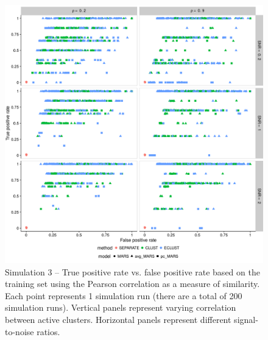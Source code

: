 \begin{appendices}
\begin{figure}
	\includegraphics[scale=0.6, keepaspectratio]{./figs/hydra/results/figures/sim3-sept27/tpr_fpr_Correlation_sim3.png}
	\caption{Simulation 3 -- True positive rate vs. false positive rate based on the training set using the Pearson correlation as a measure of similarity. Each point represents 1 simulation run (there are a total of 200 simulation runs). Vertical panels represent varying correlation between active clusters. Horizontal panels represent different signal-to-noise ratios.}
	\label{fig:tpr_fpr_Correlation_sim3}
\end{figure}



\end{appendices}
